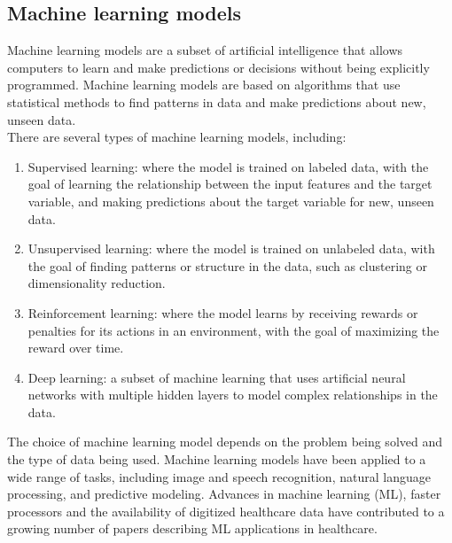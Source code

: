     \subsection{Machine learning models} \label{sec:longlp}
    Machine learning models are a subset of artificial intelligence that allows computers to learn and make predictions or decisions without being
    explicitly programmed. Machine learning models are based on algorithms that use statistical methods to find patterns in data and make predictions
    about new, unseen data.
    \\
    There are several types of machine learning models, including:
    \begin{enumerate}
        \item Supervised learning: where the model is trained on labeled data, with the goal of learning the relationship between the input
        features and the target variable, and making predictions about the target variable for new, unseen data.
        \item Unsupervised learning: where the model is trained on unlabeled data, with the goal of finding patterns or structure in the data,
        such as clustering or dimensionality reduction.
        \item Reinforcement learning: where the model learns by receiving rewards or penalties for its actions in an environment,
        with the goal of maximizing the reward over time.
        \item Deep learning: a subset of machine learning that uses artificial neural networks with multiple hidden layers to model complex
        relationships in the data.
    \end{enumerate}
    The choice of machine learning model depends on the problem being solved and the type of data being used. Machine learning models have been
    applied to a wide range of tasks, including image and speech recognition, natural language processing, and predictive modeling.
    Advances in machine learning (ML), faster processors and the availability of digitized healthcare data have contributed to a growing
    number of papers describing ML applications in healthcare.~\cite{Chen}

